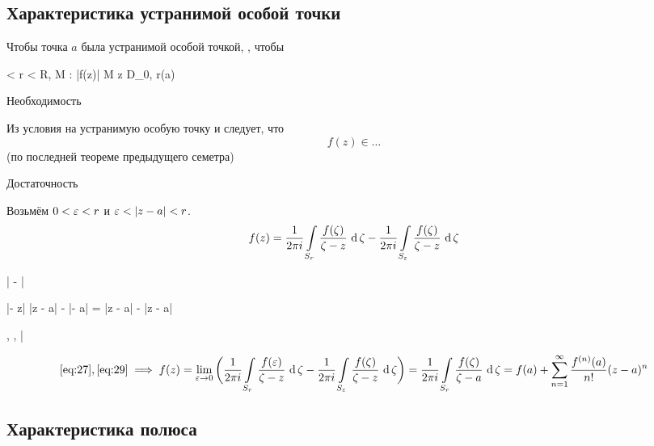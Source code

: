 \subsection{Характеристика устранимой особой точки}

\begin{theorem}
	Чтобы точка $ a $ была устранимой особой точкой, , чтобы
	\begin{equ}{26}
		 < r < R, \quad \exist M : \quad |f(z)| \le M \quad \forall z \in D_{0, r}(a)
	\end{equ}
\end{theorem}

\begin{eproof}
	\item Необходимость

	Из условия на устранимую особую точку и  следует, что
	$$ f(z) \in \dots $$
	(по последней теореме предыдущего семетра)
	\item Достаточность

	Возьмём $ 0 < \veps < r $ и $ \veps < |z - a| < r $.
	$$ f(z) = \frac1{2\pi i} \cint[\zeta]{S_r}{\frac{f(\zeta)}{\zeta - z}} - \frac1{2\pi i}\cint[\zeta]{S_\veps}{\frac{f(\zeta)}{\zeta - z}} $$
	\begin{equ}{27}
		\bigg| -  \bigg| \le {} 
	\end{equ}
	\begin{equ}{28}
		|\zeta - z| \ge |z - a| - |\zeta - a| = |z - a| - \veps \ge {}|z - a|
	\end{equ}
	\begin{equ}{29}
		, ,  \implies \bigg| %
	\end{equ}
	$$ \eref{27}, \eref{29} \implies f(z) = \liml{\veps \to 0} \bigg( \frac1{2\pi i} \cint[\zeta]{S_r}{\frac{f(\veps)}{\zeta - z}} - \frac1{2\pi i} \cint[\zeta]{S_\veps}{\frac{f(\zeta)}{\zeta - z}} \bigg) = \frac1{2\pi i} \cint[\zeta]{S_r}{\frac{f(\zeta)}{\zeta - a}} = f(a) + \sum_{n = 1}^\infty \frac{\nder f(a)}{n!} (z - a)^n $$
\end{eproof}

\subsection{Характеристика полюса}

